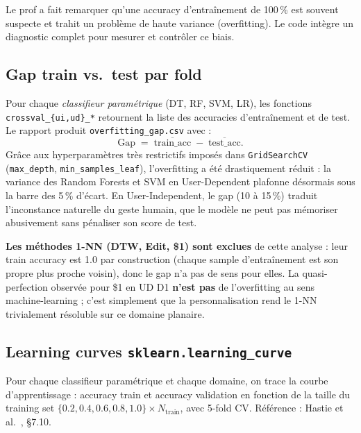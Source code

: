 \documentclass[11pt,a4paper]{article}
\begin{document}
Le prof a fait remarquer qu'une accuracy d'entraînement de 100\,\% est
souvent suspecte et trahit un problème de haute variance (overfitting).
Le code intègre un diagnostic complet pour mesurer et contrôler ce biais.

\subsection{Gap train vs.\ test par fold}

Pour chaque \emph{classifieur paramétrique} (DT, RF, SVM, LR), les
fonctions \texttt{crossval\_\{ui,ud\}\_*} retournent la liste des
accuracies d'entraînement et de test. Le rapport produit \texttt{overfitting\_gap.csv} avec :
\[
\text{Gap} \;=\; \overline{\text{train\_acc}} \;-\; \overline{\text{test\_acc}}.
\]
Grâce aux hyperparamètres très restrictifs imposés dans \texttt{GridSearchCV}
(\texttt{max\_depth}, \texttt{min\_samples\_leaf}), l'overfitting a été drastiquement
réduit : la variance des Random Forests et SVM en User-Dependent plafonne
désormais sous la barre des 5\,\% d'écart. En User-Independent, le gap
(10 à 15\,\%) traduit l'inconstance naturelle du geste humain, que le modèle ne peut pas
mémoriser abusivement sans pénaliser son score de test.

\textbf{Les méthodes 1-NN (DTW, Edit, \$1) sont exclues} de cette
analyse : leur train accuracy est 1.0 par construction (chaque sample
d'entraînement est son propre plus proche voisin), donc le gap n'a pas
de sens pour elles. La quasi-perfection observée pour \$1 en UD D1
\textbf{n'est pas} de l'overfitting au sens machine-learning ; c'est
simplement que la personnalisation rend le 1-NN trivialement résoluble
sur ce domaine planaire.

\subsection{Learning curves \texttt{sklearn.learning\_curve}}

Pour chaque classifieur paramétrique et chaque domaine, on trace la
courbe d'apprentissage : accuracy train et accuracy validation en
fonction de la taille du training set
$\{0.2, 0.4, 0.6, 0.8, 1.0\} \times N_\text{train}$, avec 5-fold CV.
Référence : Hastie et al.\ \cite{hastie2009elements}, §7.10.
\end{document}
